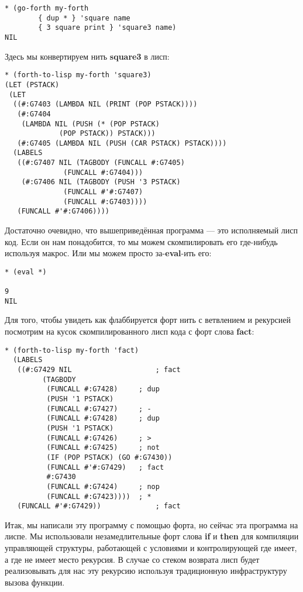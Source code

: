 \begin{verbatim}
* (go-forth my-forth
	    { dup * } 'square name
	    { 3 square print } 'square3 name)
NIL
\end{verbatim}

Здесь мы конвертируем нить \textbf{square3} в лисп:

\begin{verbatim}
* (forth-to-lisp my-forth 'square3)
(LET (PSTACK)
 (LET
  ((#:G7403 (LAMBDA NIL (PRINT (POP PSTACK))))
   (#:G7404
    (LAMBDA NIL (PUSH (* (POP PSTACK)
			 (POP PSTACK)) PSTACK)))
   (#:G7405 (LAMBDA NIL (PUSH (CAR PSTACK) PSTACK))))
  (LABELS
   ((#:G7407 NIL (TAGBODY (FUNCALL #:G7405)
			  (FUNCALL #:G7404)))
    (#:G7406 NIL (TAGBODY (PUSH '3 PSTACK)
			  (FUNCALL #'#:G7407)
			  (FUNCALL #:G7403))))
   (FUNCALL #'#:G7406))))
\end{verbatim}

Достаточно очевидно, что вышеприведённая программа --- это исполняемый лисп код. Если он нам понадобится, то мы можем скомпилировать его где-нибудь используя макрос. Или мы можем просто за-\textbf{eval}-ить его:

\begin{verbatim}
* (eval *)

9 
NIL
\end{verbatim}

Для того, чтобы увидеть как флаббируется форт нить с ветвлением и рекурсией посмотрим на кусок скомпилированного лисп кода с форт слова \textbf{fact}:

\begin{verbatim}
* (forth-to-lisp my-forth 'fact)
  (LABELS
   ((#:G7429 NIL                    ; fact
	     (TAGBODY
	      (FUNCALL #:G7428)     ; dup
	      (PUSH '1 PSTACK)
	      (FUNCALL #:G7427)     ; -
	      (FUNCALL #:G7428)     ; dup
	      (PUSH '1 PSTACK)
	      (FUNCALL #:G7426)     ; >
	      (FUNCALL #:G7425)     ; not
	      (IF (POP PSTACK) (GO #:G7430))
	      (FUNCALL #'#:G7429)   ; fact
	      #:G7430
	      (FUNCALL #:G7424)     ; nop
	      (FUNCALL #:G7423))))  ; *
   (FUNCALL #'#:G7429))             ; fact
\end{verbatim}

Итак, мы написали эту программу с помощью форта, но сейчас эта программа на лиспе. Мы использовали незамедлительные форт слова \textbf{if} и \textbf{then} для компиляции управляющей структуры, работающей с условиями и контролирующей где имеет, а где не имеет место рекурсия. В случае со стеком возврата лисп будет реализовывать для нас эту рекурсию используя традиционную инфраструктуру вызова функции.

